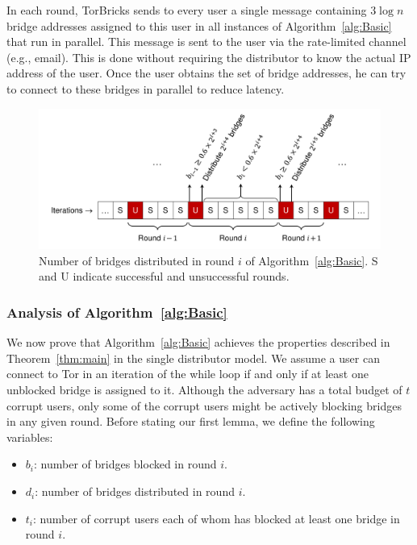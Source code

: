 \documentclass[USenglish,oneside,twocolumn]{article}
\newcommand{\fullpaper}[1]{#1}
\newcommand{\fullpaper}[1]{}
\newcommand{\bricks}{}
\def\bricks/{\textsf{\sfsize \mbox{TorBricks}}}
\newcommand{\sfsize}{\fontsize{0.68\baselineskip}{0.68\baselineskip}\selectfont}
\begin{document}
In each round, \bricks/ sends to every user a single message containing $3\log{n}$ bridge addresses assigned to this user in all  instances of Algorithm~\ref{alg:Basic} that run in parallel. This message is sent to the user via the rate-limited channel (e.g., email). \fullpaper{This is done without requiring the distributor to know the actual IP address of the user. Once the user obtains the set of bridge addresses, he can try to connect to these bridges in parallel to reduce latency.}

\begin{figure}
	\centering
	\includegraphics[width=0.75\linewidth]{images/rounds}
	\caption{Number of bridges distributed in round $i$ of Algorithm~\ref{alg:Basic}. S and U indicate successful and unsuccessful rounds.}
	\label{fig:rounds}
\end{figure}

\subsubsection{Analysis of Algorithm~\ref{alg:Basic}} \label{sec:ProofBasic}
We now prove that Algorithm~\ref{alg:Basic} achieves the properties described in Theorem~\ref{thm:main} in the single distributor model. 
We assume a user can connect to Tor in an iteration of the while loop if and only if at least one unblocked bridge is assigned to it. 
Although the adversary has a total budget of $t$ corrupt users, only some of the corrupt users might be actively blocking bridges in any given round. %
Before stating our first lemma, we define the following variables:
\begin{itemize}
	\item $b_i$: number of bridges blocked in round $i$.	
	\item $d_i$: number of bridges distributed in round $i$.
	\item $t_i$: number of corrupt users each of whom has blocked at least one bridge in round $i$.
\end{itemize}
\end{document}

